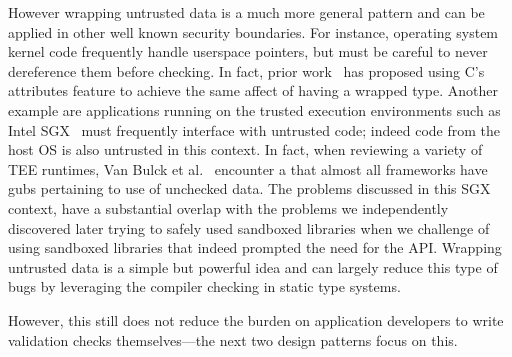 However wrapping untrusted data is a much more general pattern and can be 
applied in other well known security boundaries.
%
For instance, operating system kernel code frequently handle userspace 
pointers, but must be careful to never dereference them before checking. 
%
In fact, prior work~\cite{cqual-kernel-ptr} has proposed using C's attributes 
feature to achieve the same affect of having a wrapped type.
%
Another example are applications running on the trusted execution environments 
such as Intel SGX~ must frequently interface with untrusted code; 
indeed code from the host OS is also untrusted in this context.
%
In fact, when reviewing a variety of TEE runtimes, Van Bulck et 
al.~\cite{two-worlds-sgx} encounter a that almost all frameworks have gubs 
pertaining to use of unchecked data.
%
The problems discussed in this SGX context, have a substantial overlap with the 
problems we independently discovered later trying to safely used sandboxed 
libraries when we challenge of using sandboxed libraries that indeed prompted 
the need for the \sys API. 
%
Wrapping untrusted data is a simple but powerful idea and can largely reduce 
this type of bugs by leveraging the compiler checking in static type systems.

However, this still does not reduce the burden on application developers to 
write validation checks themselves---the next two design patterns focus on this.